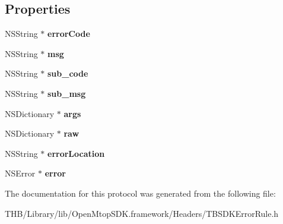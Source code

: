 \subsection*{Properties}
\begin{DoxyCompactItemize}
\item 
\mbox{\label{protocol_t_b_s_d_k_error_rule_01-p_a65139590972b3b44aded2e29aadbcd75}} 
N\+S\+String $\ast$ {\bfseries error\+Code}
\item 
\mbox{\label{protocol_t_b_s_d_k_error_rule_01-p_a5f1cd53fd330520cfa4337e41be74a82}} 
N\+S\+String $\ast$ {\bfseries msg}
\item 
\mbox{\label{protocol_t_b_s_d_k_error_rule_01-p_a1519dc99d4a6ac21e86d8991febaeba0}} 
N\+S\+String $\ast$ {\bfseries sub\+\_\+code}
\item 
\mbox{\label{protocol_t_b_s_d_k_error_rule_01-p_a72bc4b37e333892732ae10f44e7e59c8}} 
N\+S\+String $\ast$ {\bfseries sub\+\_\+msg}
\item 
\mbox{\label{protocol_t_b_s_d_k_error_rule_01-p_ad77049ff41ea881d116dbb22ab1f43e1}} 
N\+S\+Dictionary $\ast$ {\bfseries args}
\item 
\mbox{\label{protocol_t_b_s_d_k_error_rule_01-p_afdc7443280e3e1c7cc919b54fa40f502}} 
N\+S\+Dictionary $\ast$ {\bfseries raw}
\item 
\mbox{\label{protocol_t_b_s_d_k_error_rule_01-p_a3497482f4b937fbc8f5e80f84912a15c}} 
N\+S\+String $\ast$ {\bfseries error\+Location}
\item 
\mbox{\label{protocol_t_b_s_d_k_error_rule_01-p_a0f26fde3ba0d119dda373eb489cf2de6}} 
N\+S\+Error $\ast$ {\bfseries error}
\end{DoxyCompactItemize}


The documentation for this protocol was generated from the following file\+:\begin{DoxyCompactItemize}
\item 
T\+H\+B/\+Library/lib/\+Open\+Mtop\+S\+D\+K.\+framework/\+Headers/T\+B\+S\+D\+K\+Error\+Rule.\+h\end{DoxyCompactItemize}
